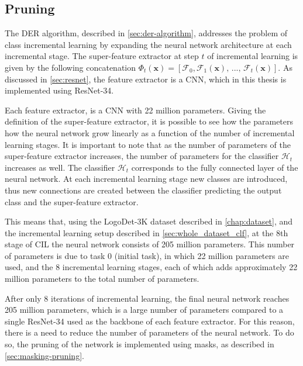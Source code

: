 \subsection{Pruning}
\label{sec:method-pruning}

The DER algorithm, described in \autoref{sec:der-algorithm}, addresses the problem of class incremental learning by expanding the neural network architecture at each incremental stage. The super-feature extractor at step $t$ of incremental learning is given by the following concatenation $\Phi_t(\mathbf{x}) = [\mathcal{F}_0,\mathcal{F}_1(\mathbf{x}), \, ..., \, \mathcal{F}_t(\mathbf{x})]$. As discussed in \autoref{sec:resnet}, the feature extractor is a CNN, which in this thesis is implemented using ResNet-34.

Each feature extractor, is a CNN with 22 million parameters.
Giving the definition of the super-feature extractor, it is possible to see how the parameters how the neural network grow linearly as a function of the number of incremental learning stages.
It is important to note that as the number of parameters of the super-feature extractor increases, the number of parameters for the classifier $\mathcal{H}_t$ increases as well.
The classifier $\mathcal{H}_t$ corresponds to the fully connected layer of the neural network. At each incremental learning stage new classes are introduced, thus new connections are created between the classifier predicting the output class and the super-feature extractor.

This means that, using the LogoDet-3K dataset described in \autoref{chap:dataset}, and the incremental learning setup described in \autoref{sec:whole_dataset_clf}, at the 8th stage of CIL the neural network consists of 205 million parameters. This number of parameters is due to task 0 (initial task), in which 22 million parameters are used, and the 8 incremental learning stages, each of which adds approximately 22 million parameters to the total number of parameters.

After only 8 iterations of incremental learning, the final neural network reaches 205 million parameters, which is a large number of parameters compared to a single ResNet-34 used as the backbone of each feature extractor.
For this reason, there is a need to reduce the number of parameters of the neural network.
To do so, the pruning of the network is implemented using masks, as described in \autoref{sec:masking-pruning}.

